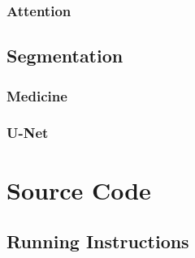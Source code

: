 \documentclass{book}
\begin{document}
\begin{appendices}
\subsection{Attention}
\section{Segmentation}
\subsection{Medicine}
\subsection{U-Net}
\chapter{Source Code}
\section{Running Instructions}
\end{appendices}



\end{document}
